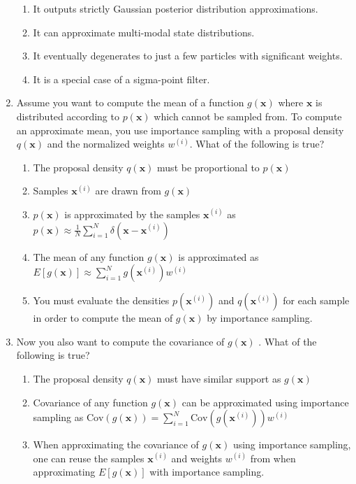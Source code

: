 \begin{enumerate}
\begin{enumerate}
\item It outputs strictly Gaussian posterior distribution approximations. 
\item It can approximate multi-modal state distributions. 
\item It eventually degenerates to just a few particles with significant weights. 
\item It is a special case of a sigma-point filter. 
\end{enumerate}

\item Assume you want to compute the mean of a function $g(\mathbf{x})$ where $\mathbf{x}$ is distributed according to $p(\mathbf{x})$ which cannot
be sampled from. To compute an approximate mean, you use importance sampling with a proposal density $q(\mathbf{x})$ and the normalized
weights $w^{(i)}$.  What of the following is true?

\begin{enumerate}
\item The proposal density $q(\mathbf{x})$ must be proportional to $p(\mathbf{x})$
\item Samples $\mathbf{x}^{(i)}$ are drawn from $g(\mathbf{x})$
\item $p(\mathbf{x})$ is approximated by the samples $\mathbf{x}^{(i)}$ as $p(\mathbf{x}) \approx \frac{1}{N}\sum_{i=1}^{N}\delta(\mathbf{x}-\mathbf{x}^{(i)})$
\item The mean of any function $g(\mathbf{x})$ is approximated as $E[g(\mathbf{x})] \approx \sum_{i=1}^{N} g(\mathbf{x}^{(i)})w^{(i)}$
\item You must evaluate the densities $p(\mathbf{x}^{(i)})$ and $q(\mathbf{x}^{(i)})$ for each sample in order to compute the mean of $g(\mathbf{x})$ by importance sampling.
\end{enumerate}

\item Now you also want to compute the covariance of $g(\mathbf{x})$ . What of the following is true?

\begin{enumerate}
\item The proposal density $q(\mathbf{x})$ must have similar support as $g(\mathbf{x})$
\item Covariance of any function $g(\mathbf{x})$ can be approximated using importance sampling as $\text{Cov}(g(\mathbf{x})) = \sum_{i=1}^{N}\text{Cov}(g(\mathbf{x}^{(i)}))w^{(i)}$
\item When approximating the covariance of $g(\mathbf{x})$  using importance sampling, one can reuse the samples $\mathbf{x}^{(i)}$ and weights $w^{(i)}$ 
from when approximating $E[g(\mathbf{x})]$ with importance sampling.
\end{enumerate}


\end{enumerate}
